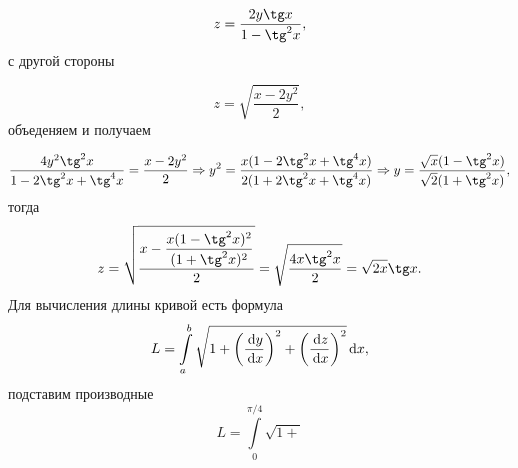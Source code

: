\documentclass{report}
\begin{document}
\begin{enumerate}
\[
    z = \dfrac{2y\tg x}{1-\tg^2 x},
\]
с другой стороны

\[
    z  = \sqrt{\dfrac{x-2y^2}{2}},
\]
объеденяем и получаем 

\[
    \dfrac{4y^2\tg^2 x}{1-2\tg^2 x+\tg^4 x} = \dfrac{x-2y^2}{2} \Rightarrow y^2 = \dfrac{x(1-2\tg^2 x+\tg^4 x)}{2(1+2\tg^2 x+\tg^4 x)} \Rightarrow y = \dfrac{\sqrt{x}(1-\tg^2 x)}{\sqrt{2}(1+\tg^2 x)},
\]
тогда 
\[
    z = \sqrt{\dfrac{x-\dfrac{x(1-\tg^2 x)^2}{(1+\tg^2 x)^2}}{2}} = \sqrt{\dfrac{4x\tg^2 x}{2}} = \sqrt{2x}\tg x.
\]
Для вычисления длины кривой есть формула
\[
L = \int\limits_{a}^{b}\sqrt{1+\left(\frac{\dl y}{\dl x}\right)^2 + \left(\frac{\dl z}{\dl x}\right)^2}\dl x,
\]
подставим производные
\[
    L = \int\limits_{0}^{\pi/4} \sqrt{1+}
\]

\end{enumerate}
\end{document}

